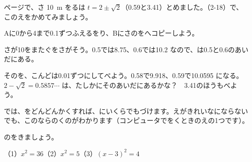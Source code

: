 \begin{yattemiyou}
\pageref{bk:3-10:heihou}ページで、さ \qty{10}{m} をるは $t=2\pm\sqrt{2}$（0.59と3.41）とめました。（2-18）で、このえをかめてみましょう。
\begin{bkcenter}
\end{bkcenter}
\begin{enumerate}[label={\bkcircled[bkGreen]{\arabic*}}, leftmargin=2.4\zw, itemsep=1pt, topsep=3pt]
\item Aに0から4まで0.1ずつふえるをり、Bにさのをへコピーしよう。
\item {}さが10をまたぐをさがそう。0.5では8.75、0.6では10.2 なので、は0.5と0.6のあいだにある。
\item そのを、こんどは0.01ずつにしてべよう。0.58で9.918、0.59で10.0595 になる。$2-\sqrt{2}=0.5857\cdots$ は、たしかにそのあいだにあるかな？　3.41のほうもべよう。
\end{enumerate}
では、をどんどんかくすれば、にいくらでもづけます。えがきれいなにならないでも、このならのくのがわかります（コンピュータでをくときのえの1つです）。
\end{yattemiyou}

\bkendproblems
{}

\bkproblem {}のをきましょう。\par\hspace*{1\zw}（1）\nobreak $x^2=36$\quad（2）\nobreak $x^2=5$\quad（3）\nobreak $(x-3)^2=4$

